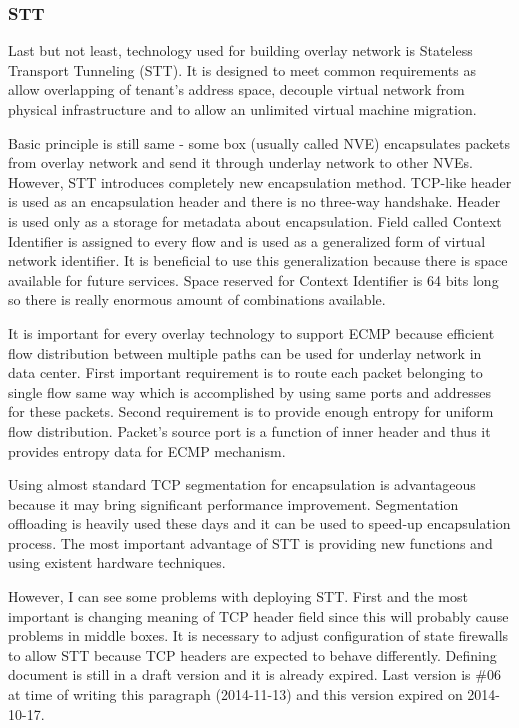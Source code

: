 \subsubsection{STT}
Last but not least, technology used for building overlay network is Stateless Transport Tunneling (\Ac{STT}). It is designed to meet common requirements as allow overlapping of tenant's address space, decouple virtual network from physical infrastructure and to allow an unlimited virtual machine migration.

Basic principle is still same - some box (usually called \Ac{NVE}) encapsulates packets from overlay network and send it through underlay network to other \Ac{NVE}s. However, \Ac{STT} introduces completely new encapsulation method. \Ac{TCP}-like header is used as an encapsulation header and there is no three-way handshake. Header is used only as a storage for metadata about encapsulation. Field called Context Identifier is assigned to every flow and is used as a generalized form of virtual network identifier. \cite{draft-stt} It is beneficial to use this generalization because there is space available for future services. Space reserved for Context Identifier is 64 bits long so there is really enormous amount of combinations available.

It is important for every overlay technology to support \Ac{ECMP} because efficient flow distribution between multiple paths can be used for underlay network in data center. First important requirement is to route each packet belonging to single flow same way which is accomplished by using same ports and addresses for these packets. 
Second requirement is to provide enough entropy for uniform flow distribution. Packet's source port is a function of inner header and thus it provides entropy data for \Ac{ECMP} mechanism.

Using almost standard \Ac{TCP} segmentation for encapsulation is advantageous because it may bring significant performance improvement. Segmentation offloading is heavily used these days and it can be used to speed-up encapsulation process. The most important advantage of \Ac{STT} is providing new functions and using existent hardware techniques.

However, I can see some problems with deploying \Ac{STT}. First and the most important is changing meaning of \Ac{TCP} header field since this will probably cause problems in middle boxes. It is necessary to adjust configuration of state firewalls to allow \Ac{STT} because \Ac{TCP} headers are expected to behave differently. Defining document \cite{draft-stt} is still in a draft version and it is already expired. Last version is \#06 at time of writing this paragraph (2014-11-13) and this version expired on 2014-10-17. 

